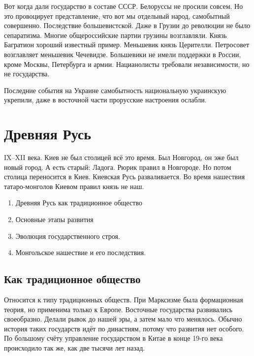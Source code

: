 \begin{azItems}
Вот когда дали государство в составе СССР. Белоруссы не просили совсем. Но это провоцирует представление, что вот мы отдельный народ, самобытный совершенно. Последствие большевистской. Даже в Грузии до революции не было сепаратизма. Многие общероссийские партии грузины возглавляли. Князь Багратион хороший известный пример. Меньшевик князь Церителли. Петросовет возглавляет меньшевик Чечевидзе. Большевики не имели поддержки в России, кроме Москвы, Петербурга и армии. Нацианолисты требовали независимости, но не государства. 

Последние события на Украине самобытность национальную украинскую укрепили, даже в восточной части прорусские настроения ослабли.
\end{azItems}
\section{Древняя Русь}
IX--XII века. Киев не был столицей всё это время. Был Новгород, он эже был новый город. А есть старый: Ладога. Рюрик правил в Новгороде. Но потом столица переносится в Киев. Киевская Русь разваливается. Во время нашествия татаро-монголов Киевом правил князь не наш. 

\begin{enumerate}
\item 
Древняя Русь как традиционное общество
\item Основные этапы развития
\item Эволюция государственного строя.
\item Монгольское нашествие и его последствия.
\end{enumerate}
\subsection{Как традиционное общество}
Относится к типу традиционных обществ. При Марксизме была формационная теория, но применима только к Европе. Восточные государства развивались своеобразно. Делали рывок до нашей эры, а затем мало что менялось. Обычно история таких государств идёт по династиям, потому что развития нет особого. По большому счёту управление государством в Китае в конце 19-го века происходило так же, как две тысячи лет назад.

